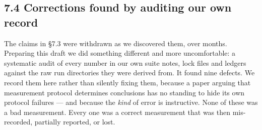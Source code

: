 \subsection{7.4 Corrections found by auditing our own record}\label{corrections-found-by-auditing-our-own-record}

The claims in \S7.3 were withdrawn as we discovered them, over months. Preparing this draft we did
something different and more uncomfortable: a systematic audit of every number in our own suite
notes, lock files and ledgers against the raw run directories they were derived from. It found
nine defects. We record them here rather than silently fixing them, because a paper arguing that
measurement protocol determines conclusions has no standing to hide its own protocol failures ---
and because the \emph{kind} of error is instructive. None of these was a bad measurement. Every one was
a correct measurement that was then mis-recorded, partially reported, or lost.

